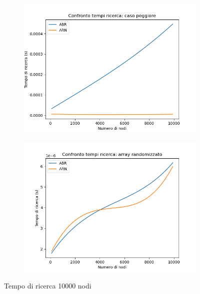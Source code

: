 \documentclass[
]{article}
\begin{document}
\begin{figure}[h!]
	\centering
	\begin{subfigure}[b]{0.4\linewidth}
		\includegraphics[width=\linewidth]{../../img/w_case/s_10000.png}
	\end{subfigure}
	\begin{subfigure}[b]{0.4\linewidth}
		\includegraphics[width=\linewidth]{../../img/rand/s_10000.png}
	\end{subfigure}
	\caption{Tempo di ricerca 10000 nodi}
	\label{fig:3}
\end{figure}
\end{document}
